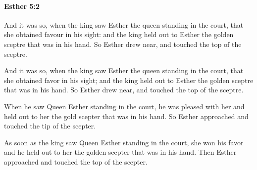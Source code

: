 		\paragraph{Esther 5:2} %
			\label{ESTHER-5-2}

			And it was so, when the king saw Esther the queen standing in the court, that she obtained favour in his sight: and the king held out to Esther the golden sceptre that was in his hand. So Esther drew near, and touched the top of the sceptre.

			\begin{versebox}
					\item[BHS] 
					\item[LXX] 
					\item[ASV] And it was so, when the king saw Esther the queen standing in the court, that she obtained favor in his sight; and the king held out to Esther the golden sceptre that was in his hand. So Esther drew near, and touched the top of the sceptre.
					\item[NIV] When he saw Queen Esther standing in the court, he was pleased with her and held out to her the gold scepter that was in his hand. So Esther approached and touched the tip of the scepter.
					\item[NRSV] As soon as the king saw Queen Esther standing in the court, she won his favor and he held out to her the golden scepter that was in his hand. Then Esther approached and touched the top of the scepter.
			\end{versebox}

